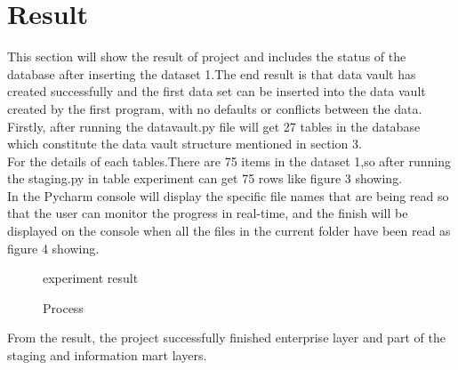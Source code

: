 \documentclass[conference]{IEEEtran}
\begin{document}
\section{Result}
This section will show the result of project and includes the status of the database after inserting the dataset 1.The end result is that data vault has created successfully and the first data set can be inserted into the data vault created by the first program, with no defaults or conflicts between the data.
Firstly, after running the datavault.py file will get 27 tables in the database which constitute the data vault structure mentioned in section 3.\\
\hspace*{0.2cm} For the details of each tables.There are 75 items in the dataset 1,so after running the staging.py in table experiment can get 75 rows like figure 3 showing.\\
\hspace*{0.2cm} In the Pycharm console will display the specific file names that are being read so that the user can monitor the progress in real-time, and the finish will be displayed on the console when all the files in the current folder have been read as figure 4 showing.\\
\begin{figure}[htbp]
	\caption{experiment result}
	\label{experiment}
\end{figure}
\begin{figure}[htbp]
	\caption{Process}
	\label{finish}
\end{figure}
\hspace*{0.2cm} From the result, the project successfully finished enterprise layer and part of the staging and information mart layers.
\end{document}
